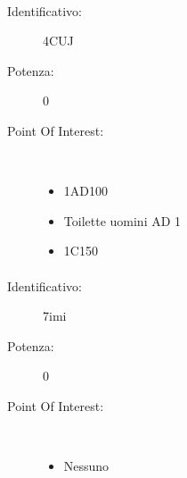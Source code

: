 \documentclass[../SperimentazioniPratiche.tex]{subfiles}
\begin{document}
			\paragraph*{}
			\label{01003}
			\begin{tcolorbox}[fonttitle=\bfseries, 
								adjusted title={\Large Beacon 01003},
								sharp corners=south,
								colback=white, 
								colframe=white!50!blue!75!black]
								
				\begin{description}
					\item[Identificativo:] 4CUJ
					\item[Potenza:] 0

					\tcbline					
					
					\item[Point Of Interest:] \ \par
					\begin{itemize}
						\item 1AD100
						\item Toilette uomini AD 1
						\item 1C150
					\end{itemize}					   				
				\end{description}  				
			\end{tcolorbox}
			
			\paragraph*{}
			\label{01004}
			\begin{tcolorbox}[fonttitle=\bfseries, 
								adjusted title={\Large Beacon 01004},
								sharp corners=south,
								colback=white, 
								colframe=white!50!blue!75!black]
								
				\begin{description}
					\item[Identificativo:] 7imi
					\item[Potenza:] 0

					\tcbline					
					
					\item[Point Of Interest:] \ \par
					\begin{itemize}
						\item Nessuno
					\end{itemize}					   				
				\end{description}  				
			\end{tcolorbox}
			
\end{document}
